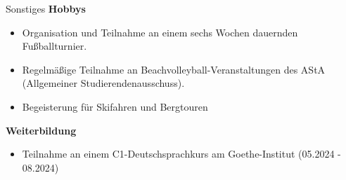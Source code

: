 
\begin{rubric}{Sonstiges}
\entry*[] \textbf{Hobbys} \newline
\vspace{\CVItemizeHeaderSpacing} \begin{itemize}[leftmargin=*, rightmargin=1cm]
	\setlength{\itemsep}{\CVItemizeSpacing}  
	\item Organisation und Teilnahme an einem sechs Wochen dauernden Fußballturnier.
	\item Regelmäßige Teilnahme an Beachvolleyball-Veranstaltungen des AStA (Allgemeiner Studierendenausschuss).  
	\item Begeisterung für Skifahren und Bergtouren 
\end{itemize}
\entry*[] \textbf{Weiterbildung} \newline
\vspace{\CVItemizeHeaderSpacing} \begin{itemize}[leftmargin=*, rightmargin=1cm]
	\setlength{\itemsep}{\CVItemizeSpacing}  
	\item Teilnahme an einem C1-Deutschsprachkurs am Goethe-Institut (05.2024 - 08.2024)
\end{itemize}
\end{rubric}
